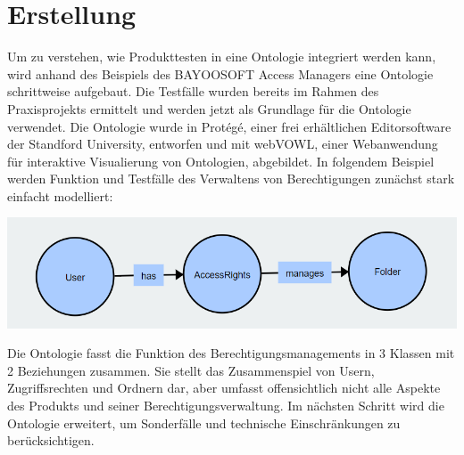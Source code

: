 \section{Erstellung}
Um zu verstehen, wie Produkttesten in eine Ontologie integriert werden kann, wird anhand des Beispiels des BAYOOSOFT Access Managers eine Ontologie schrittweise aufgebaut. Die Testfälle wurden bereits im Rahmen des Praxisprojekts ermittelt und werden jetzt als Grundlage für die Ontologie verwendet. Die Ontologie wurde in Protégé, einer frei erhältlichen Editorsoftware der Standford University, entworfen und mit webVOWL, einer Webanwendung für interaktive Visualierung von Ontologien, abgebildet. \newline
In folgendem Beispiel werden Funktion und Testfälle des Verwaltens von Berechtigungen zunächst stark einfacht modelliert:\\

\begin{center}
    \includegraphics[width=1\textwidth]{Thesis/Images/OntologySmall.png}        
\end{center}

Die Ontologie fasst die Funktion des Berechtigungsmanagements in 3 Klassen mit 2 Beziehungen zusammen. Sie stellt das Zusammenspiel von Usern, Zugriffsrechten und Ordnern dar, aber umfasst offensichtlich nicht alle Aspekte des Produkts und seiner Berechtigungsverwaltung. Im nächsten Schritt wird die Ontologie erweitert, um Sonderfälle und technische Einschränkungen zu berücksichtigen.\\

